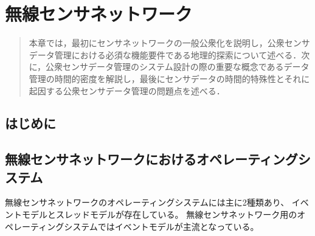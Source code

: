 \chapter{無線センサネットワーク}
\begin{large}
\begin{quote}
本章では，最初にセンサネットワークの一般公衆化を説明し，公衆センサデータ管理における必須な機能要件である地理的探索について述べる．次に，公衆センサデータ管理のシステム設計の際の重要な概念であるデータ管理の時間的密度を解説し，最後にセンサデータの時間的特殊性とそれに起因する公衆センサデータ管理の問題点を述べる．
\end{quote}
\end{large}
\clearpage

\section{はじめに}

\section{無線センサネットワークにおけるオペレーティングシステム}
無線センサネットワークのオペレーティングシステムには主に2種類あり、
イベントモデルとスレッドモデルが存在している。
無線センサネットワーク用のオペレーティングシステムではイベントモデルが主流となっている。

